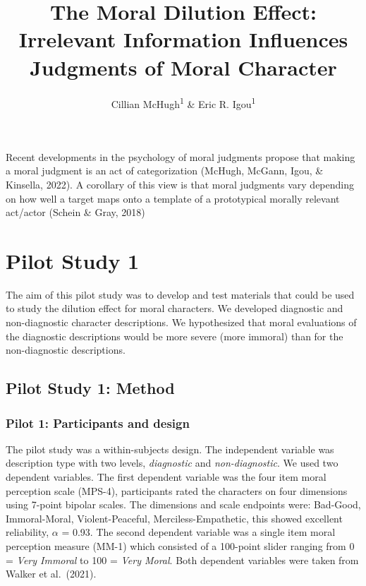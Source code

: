 \documentclass[
  english,
  man,floatsintext]{apa7}
\title{The Moral Dilution Effect: Irrelevant Information Influences Judgments of Moral Character}
\author{Cillian McHugh\textsuperscript{1} \& Eric R. Igou\textsuperscript{1}}
\date{}
\affiliation{\vspace{0.5cm}\textsuperscript{1} University of Limerick}
\begin{document}
\maketitle

Recent developments in the psychology of moral judgments propose that making a moral judgment is an act of categorization (McHugh, McGann, Igou, \& Kinsella, 2022). A corollary of this view is that moral judgments vary depending on how well a target maps onto a template of a prototypical morally relevant act/actor (Schein \& Gray, 2018)

\hypertarget{pilot-study-1}{%
\section{Pilot Study 1}\label{pilot-study-1}}

The aim of this pilot study was to develop and test materials that could be used to study the dilution effect for moral characters. We developed diagnostic and non-diagnostic character descriptions. We hypothesized that moral evaluations of the diagnostic descriptions would be more severe (more immoral) than for the non-diagnostic descriptions.

\hypertarget{pilot-study-1-method}{%
\subsection{Pilot Study 1: Method}\label{pilot-study-1-method}}

\hypertarget{pilot-1-participants-and-design}{%
\subsubsection{Pilot 1: Participants and design}\label{pilot-1-participants-and-design}}

The pilot study was a within-subjects design. The independent variable was description type with two levels, \emph{diagnostic} and \emph{non-diagnostic}. We used two dependent variables. The first dependent variable was the four item moral perception scale (MPS-4), participants rated the characters on four dimensions using 7-point bipolar scales. The dimensions and scale endpoints were: Bad-Good, Immoral-Moral, Violent-Peaceful, Merciless-Empathetic, this showed excellent reliability, \(\alpha\) = 0.93. The second dependent variable was a single item moral perception measure (MM-1) which consisted of a 100-point slider ranging from 0 = \emph{Very Immoral} to 100 = \emph{Very Moral}. Both dependent variables were taken from Walker et al.~(2021).
\end{document}
